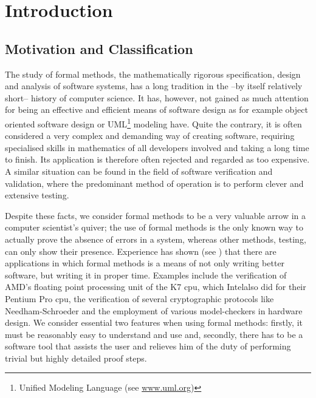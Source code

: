 

\chapter{Introduction}
\label{cha:introduction}


\section{Motivation and Classification}
\label{sec:motiv-class}

The study of formal methods, \IE the mathematically rigorous specification,
design and analysis of software systems, has a long tradition in the --by itself
relatively short-- history of computer science. It has, however, not gained as
much attention for being an effective and efficient means of software design as
for example object oriented software design or UML\footnote{Unified Modeling
  Language (see \url{www.uml.org})} modeling have. Quite the contrary, it is
often considered a very complex and demanding way of creating software,
requiring specialised skills in mathematics of all developers involved and
taking a long time to finish. Its application is therefore often rejected and
regarded as too expensive. A similar situation can be found in the field of
software verification and validation, where the predominant method of operation
is to perform clever and extensive testing.

Despite these facts, we consider formal methods to be a very valuable arrow in a
computer scientist's quiver; the use of formal methods is the only known way to
actually prove the absence of errors in a system, whereas other methods, \EG
testing, can only show their presence. Experience has shown (see
\cite{KuhnChandramouliButler02,SobelClarkson02}) that there are applications
in which formal methods is a means of not only writing better software, but writing
it in proper time. Examples include the verification of AMD\TM's floating point
processing unit of the K7 cpu, which Intel\TM also did for their Pentium Pro
cpu, the verification of several cryptographic protocols like Needham-Schroeder
and the employment of various model-checkers in hardware design. We consider
essential two features when using formal methods: firstly, it must be
reasonably easy to understand and use and, secondly, there has to be a software
tool that assists the user and relieves him of the duty of performing trivial
but highly detailed proof steps.

